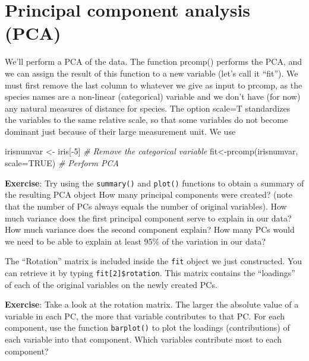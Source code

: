 \documentclass[
]{book}
\newenvironment{Shaded}{\begin{snugshade}}{\end{snugshade}}
\newcommand{\AttributeTok}[1]{\textcolor[rgb]{0.77,0.63,0.00}{#1}}
\newcommand{\CommentTok}[1]{\textcolor[rgb]{0.56,0.35,0.01}{\textit{#1}}}
\newcommand{\ConstantTok}[1]{\textcolor[rgb]{0.00,0.00,0.00}{#1}}
\newcommand{\DecValTok}[1]{\textcolor[rgb]{0.00,0.00,0.81}{#1}}
\newcommand{\FunctionTok}[1]{\textcolor[rgb]{0.00,0.00,0.00}{#1}}
\newcommand{\NormalTok}[1]{#1}
\newcommand{\OtherTok}[1]{\textcolor[rgb]{0.56,0.35,0.01}{#1}}
\newcommand{\SpecialCharTok}[1]{\textcolor[rgb]{0.00,0.00,0.00}{#1}}
\begin{document}
\hypertarget{principal-component-analysis-pca}{%
\section{Principal component analysis (PCA)}\label{principal-component-analysis-pca}}

We'll perform a PCA of the data. The function prcomp() performs the PCA, and we can assign the result of this function to a new variable (let's call it ``fit''). We must first remove the last column to whatever we give as input to prcomp, as the species names are a non-linear (categorical) variable and we don't have (for now) any natural measures of distance for species. The option scale=T standardizes the variables to the same relative scale, so that some variables do not become dominant just because of their large measurement unit. We use

\begin{Shaded}
\begin{Highlighting}[]
\NormalTok{irisnumvar }\OtherTok{\textless{}{-}}\NormalTok{ iris[}\SpecialCharTok{{-}}\DecValTok{5}\NormalTok{] }\CommentTok{\# Remove the categorical variable}
\NormalTok{fit}\OtherTok{\textless{}{-}}\FunctionTok{prcomp}\NormalTok{(irisnumvar, }\AttributeTok{scale=}\ConstantTok{TRUE}\NormalTok{) }\CommentTok{\# Perform PCA}
\end{Highlighting}
\end{Shaded}

\textbf{Exercise}: Try using the \texttt{summary()} and \texttt{plot()} functions to obtain a summary of the resulting PCA object How many principal components were created? (note that the number of PCs always equals the number of original variables). How much variance does the first principal component serve to explain in our data? How much variance does the second component explain? How many PCs would we need to be able to explain at least 95\% of the variation in our data?

The ``Rotation'' matrix is included inside the \texttt{fit} object we just constructed. You can retrieve it by typing \texttt{fit{[}2{]}\$rotation}. This matrix contains the ``loadings'' of each of the original variables on the newly created PCs.

\textbf{Exercise}: Take a look at the rotation matrix. The larger the absolute value of a variable in each PC, the more that variable contributes to that PC. For each component, use the function \texttt{barplot()} to plot the loadings (contributions) of each variable into that component. Which variables contribute most to each component?
\end{document}
